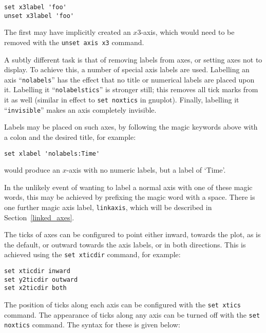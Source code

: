 \begin{verbatim}
set x3label 'foo'
unset x3label 'foo'
\end{verbatim}

\noindent The first may have implicitly created an $x3$-axis, which would need
to be removed with the \texttt{unset axis x3} command.

A subtly different task is that of removing labels from axes, or setting axes
not to display. To achieve this, a number of special axis labels are used.
Labelling an axis ``\texttt{nolabels}'' has the effect that no title or numerical
labels are placed upon it. Labelling it\label{nolabelstics}
``\texttt{nolabelstics}'' is stronger still; this removes all tick marks from it as well
(similar in effect to \texttt{set noxtics} in gnuplot). Finally, labelling it
``\texttt{invisible}''
makes an axis completely invisible.

Labels may be placed on such axes, by following the magic keywords above with a
colon and the desired title, for example:

\begin{verbatim}
set xlabel 'nolabels:Time'
\end{verbatim}

\noindent would produce an $x$-axis with no numeric labels, but a label of
`Time'.

In the unlikely event of wanting
to label a normal axis with one of these magic words, this may be achieved by prefixing the magic
word with a space. There is one further magic axis label, \texttt{linkaxis},
which will be described in Section~\ref{linked_axes}.

The ticks of axes can be configured to point either inward, towards the plot,
as is the default, or outward towards the axis labels, or in both directions.
This is achieved using the \texttt{set xticdir} command, for example:

\begin{verbatim}
set xticdir inward
set y2ticdir outward
set x2ticdir both
\end{verbatim}

The position of ticks along each axis can be configured with the \texttt{set
xtics} command. The
appearance of ticks along any axis can be turned off with the \texttt{set
noxtics} command. The
syntax for these is given below:

